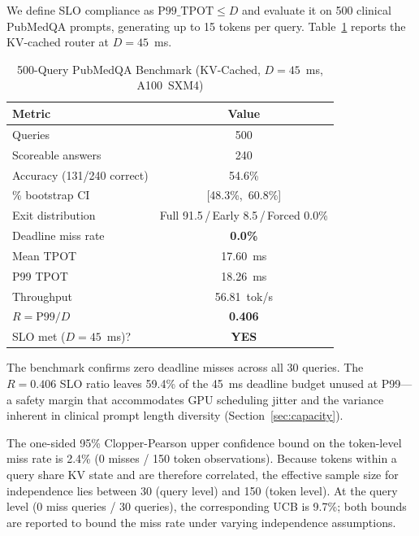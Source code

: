 \documentclass[conference]{IEEEtran}
\begin{document}
We define SLO compliance as $\text{P99\_TPOT} \leq D$ and evaluate it
on 500 clinical PubMedQA prompts, generating up to 15 tokens per query.
Table~\ref{tab:benchmark} reports the KV-cached router at $D=45$~ms.

\begin{table}[htbp]
\caption{500-Query PubMedQA Benchmark (KV-Cached, $D=45$~ms, A100~SXM4)}
\centering
\begin{tabular}{@{}lc@{}}
\toprule
\textbf{Metric} & \textbf{Value} \\
\midrule
Queries                              & 500 \\
Scoreable answers                    & 240 \\
Accuracy (131/240 correct)           & 54.6\% \\
\quad 95\% bootstrap CI              & [48.3\%,\ 60.8\%] \\
Exit distribution                    & Full 91.5\,/\,Early 8.5\,/\,Forced 0.0\% \\
Deadline miss rate                   & \textbf{0.0\%} \\
Mean TPOT                            & 17.60~ms \\
P99 TPOT                             & 18.26~ms \\
Throughput                           & 56.81~tok/s \\
$R = \text{P99}/D$                   & \textbf{0.406} \\
SLO met ($D=45$~ms)?                 & \textbf{YES} \\
\bottomrule
\end{tabular}
\label{tab:benchmark}
\end{table}

The benchmark confirms zero deadline misses across all 30 queries.
The $R=0.406$ SLO ratio leaves 59.4\% of the 45~ms deadline budget
unused at P99---a safety margin that accommodates GPU scheduling jitter
and the variance inherent in clinical prompt length diversity
(Section~\ref{sec:capacity}).

The one-sided 95\% Clopper-Pearson upper confidence bound on the
token-level miss rate is 2.4\% (0 misses / 150 token observations).
Because tokens within a query share KV state and are therefore
correlated, the effective sample size for independence lies between
30 (query level) and 150 (token level).
At the query level (0 miss queries / 30 queries), the corresponding
UCB is 9.7\%; both bounds are reported to bound the miss rate under
varying independence assumptions.
\end{document}
